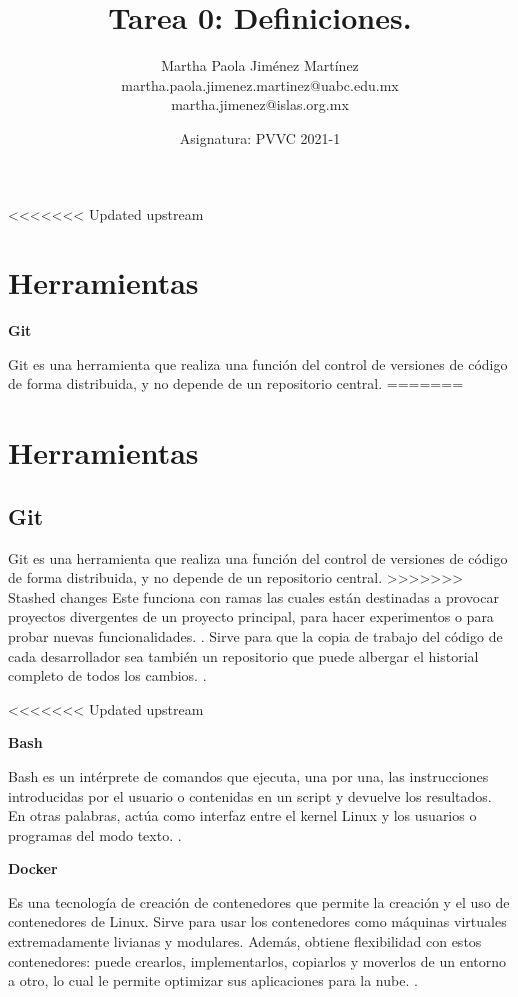 \documentclass[12pt,letterpaper]{article}
\begin{document}
\title{\textbf{Tarea 0: 
Definiciones.}}
\author{Martha Paola Jim\'enez Mart\'inez \\
\small{martha.paola.jimenez.martinez@uabc.edu.mx} \\
\small{martha.jimenez@islas.org.mx}}
\date{ \small{Asignatura: PVVC 2021-1}
} 
\maketitle

<<<<<<< Updated upstream
\section{Herramientas}
\item\textbf{Git}
\item Git es una herramienta que realiza una funci\'on del control de versiones de c\'odigo de forma distribuida, y no depende de un repositorio central.
=======
\section*{Herramientas}
\subsection*{Git}
Git es una herramienta que realiza una funci\'on del control de versiones de c\'odigo de forma distribuida, y no depende de un repositorio central.
>>>>>>> Stashed changes
Este funciona con ramas las cuales est\'an destinadas a provocar proyectos divergentes de un proyecto principal, para hacer experimentos o para probar nuevas funcionalidades.
 \cite[( Rubio, J. 2020)]{ref1}.
Sirve para que la copia de trabajo del c\'odigo de cada desarrollador sea tambi\'en un repositorio que puede albergar el historial completo de todos los cambios.
 \cite[(Bitbucket. s.f.)]{ref2}.

<<<<<<< Updated upstream
\item\textbf{Bash}
\item Bash es un int\'erprete de comandos que ejecuta, una por una, las instrucciones introducidas por el usuario o contenidas en un script y devuelve los resultados. En otras palabras, act\'ua como interfaz entre el kernel Linux y los usuarios o programas del modo texto.
 \cite[(Canepa, G. 2018)]{ref3}.

\item\textbf{Docker}
\item Es una tecnolog\'ia de creación de contenedores que permite la creaci\'on y el uso de contenedores de Linux.
Sirve para usar los contenedores como m\'aquinas virtuales extremadamente livianas y modulares. Adem\'as, obtiene flexibilidad con estos contenedores: puede crearlos, implementarlos, copiarlos y moverlos de un entorno a otro, lo cual le permite optimizar sus aplicaciones para la nube.
 \cite[( RedHat. s.f.)]{ref4}.
\end{document}
